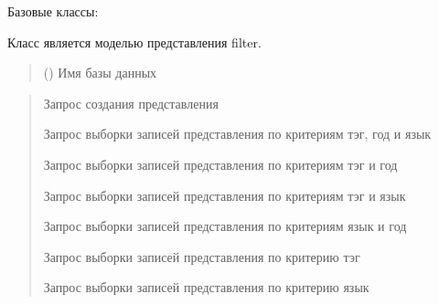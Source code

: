 \documentclass[letterpaper,10pt,russian]{sphinxmanual}
\begin{document}
\begin{fulllineitems}
\label{\detokenize{database.sqlite3_interface.views:database.sqlite3_interface.views.view_filter.ViewFilter}}
\pysigstartsignatures
{}
\pysigstopsignatures
\sphinxAtStartPar
Базовые классы: {\hyperref[\detokenize{database.sqlite3_interface.views:database.sqlite3_interface.views.view.View}]{}}

\sphinxAtStartPar
Класс является моделью представления filter.
\begin{quote}\begin{description}
\sphinxAtStartPar
{} () \textendash{} Имя базы данных

\end{description}\end{quote}
\begin{description}
\begin{quote}\begin{description}
\sphinxAtStartPar
Запрос создания представления

\sphinxAtStartPar
Запрос выборки записей представления по критериям тэг, год и язык

\sphinxAtStartPar
Запрос выборки записей представления по критериям тэг и год

\sphinxAtStartPar
Запрос выборки записей представления по критериям тэг и язык

\sphinxAtStartPar
Запрос выборки записей представления по критериям язык и год

\sphinxAtStartPar
Запрос выборки записей представления по критерию тэг

\sphinxAtStartPar
Запрос выборки записей представления по критерию язык


\end{description}
\end{quote}
\end{description}
\end{fulllineitems}
\end{document}
